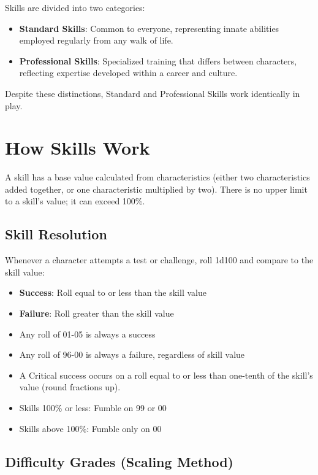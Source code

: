 \documentclass[10pt]{article}
\begin{document}
Skills are divided into two categories:

\begin{itemize}
    \item \textbf{Standard Skills}: Common to everyone, representing innate abilities employed regularly from any walk of life.
    \item \textbf{Professional Skills}: Specialized training that differs between characters, reflecting expertise developed within a career and culture.
\end{itemize}

Despite these distinctions, Standard and Professional Skills work identically in play.

\section{How Skills Work}

A skill has a base value calculated from characteristics (either two characteristics added together, or one characteristic multiplied by two). There is no upper limit to a skill's value; it can exceed 100\%.

\subsection{Skill Resolution}

Whenever a character attempts a test or challenge, roll 1d100 and compare to the skill value:

\begin{itemize}
    \item \textbf{Success}: Roll equal to or less than the skill value
    \item \textbf{Failure}: Roll greater than the skill value
    \item Any roll of 01-05 is always a success
    \item Any roll of 96-00 is always a failure, regardless of skill value
    \item A Critical success occurs on a roll equal to or less than one-tenth of the skill's value (round fractions up).
    \item Skills 100\% or less: Fumble on 99 or 00
    \item Skills above 100\%: Fumble only on 00
\end{itemize}

\subsection{Difficulty Grades (Scaling Method)}
\end{document}
